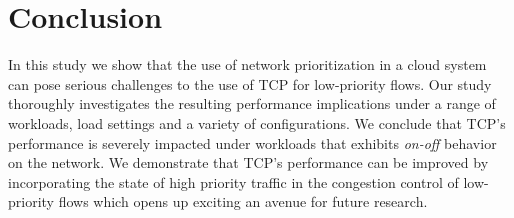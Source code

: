 \section{Conclusion} 
\label{sec:conclusion}
In this study we show that the use of network prioritization in a cloud system can pose serious challenges to the use of TCP for low-priority flows. Our study thoroughly investigates the resulting performance implications under a range of workloads, load settings and a variety of configurations. We conclude that TCP's performance is severely impacted under workloads that exhibits \emph{on-off} behavior on the network. We demonstrate that TCP's performance can be improved by incorporating the state of high priority traffic in the congestion control of low-priority flows which opens up exciting an avenue for future research.
